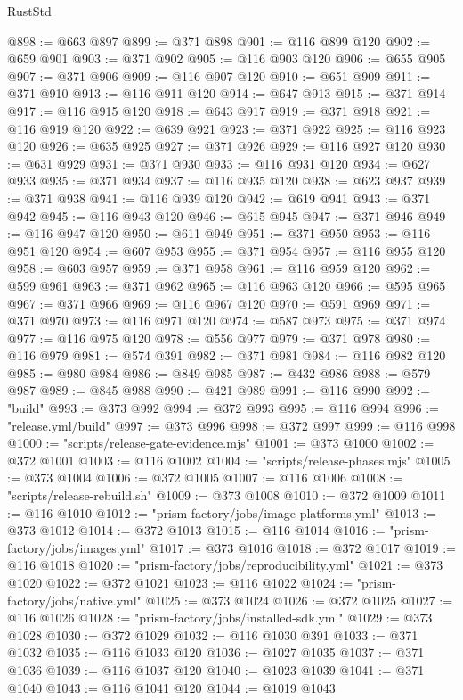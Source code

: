 \begin{lexlean}{RustStd}
\begin{coremodule}
@898 := @663 @897
@899 := @371 @898
@901 := @116 @899 @120
@902 := @659 @901
@903 := @371 @902
@905 := @116 @903 @120
@906 := @655 @905
@907 := @371 @906
@909 := @116 @907 @120
@910 := @651 @909
@911 := @371 @910
@913 := @116 @911 @120
@914 := @647 @913
@915 := @371 @914
@917 := @116 @915 @120
@918 := @643 @917
@919 := @371 @918
@921 := @116 @919 @120
@922 := @639 @921
@923 := @371 @922
@925 := @116 @923 @120
@926 := @635 @925
@927 := @371 @926
@929 := @116 @927 @120
@930 := @631 @929
@931 := @371 @930
@933 := @116 @931 @120
@934 := @627 @933
@935 := @371 @934
@937 := @116 @935 @120
@938 := @623 @937
@939 := @371 @938
@941 := @116 @939 @120
@942 := @619 @941
@943 := @371 @942
@945 := @116 @943 @120
@946 := @615 @945
@947 := @371 @946
@949 := @116 @947 @120
@950 := @611 @949
@951 := @371 @950
@953 := @116 @951 @120
@954 := @607 @953
@955 := @371 @954
@957 := @116 @955 @120
@958 := @603 @957
@959 := @371 @958
@961 := @116 @959 @120
@962 := @599 @961
@963 := @371 @962
@965 := @116 @963 @120
@966 := @595 @965
@967 := @371 @966
@969 := @116 @967 @120
@970 := @591 @969
@971 := @371 @970
@973 := @116 @971 @120
@974 := @587 @973
@975 := @371 @974
@977 := @116 @975 @120
@978 := @556 @977
@979 := @371 @978
@980 := @116 @979
@981 := @574 @391
@982 := @371 @981
@984 := @116 @982 @120
@985 := @980 @984
@986 := @849 @985
@987 := @432 @986
@988 := @579 @987
@989 := @845 @988
@990 := @421 @989
@991 := @116 @990
@992 := "build"
@993 := @373 @992
@994 := @372 @993
@995 := @116 @994
@996 := "release.yml/build"
@997 := @373 @996
@998 := @372 @997
@999 := @116 @998
@1000 := "scripts/release-gate-evidence.mjs"
@1001 := @373 @1000
@1002 := @372 @1001
@1003 := @116 @1002
@1004 := "scripts/release-phases.mjs"
@1005 := @373 @1004
@1006 := @372 @1005
@1007 := @116 @1006
@1008 := "scripts/release-rebuild.sh"
@1009 := @373 @1008
@1010 := @372 @1009
@1011 := @116 @1010
@1012 := "prism-factory/jobs/image-platforms.yml"
@1013 := @373 @1012
@1014 := @372 @1013
@1015 := @116 @1014
@1016 := "prism-factory/jobs/images.yml"
@1017 := @373 @1016
@1018 := @372 @1017
@1019 := @116 @1018
@1020 := "prism-factory/jobs/reproducibility.yml"
@1021 := @373 @1020
@1022 := @372 @1021
@1023 := @116 @1022
@1024 := "prism-factory/jobs/native.yml"
@1025 := @373 @1024
@1026 := @372 @1025
@1027 := @116 @1026
@1028 := "prism-factory/jobs/installed-sdk.yml"
@1029 := @373 @1028
@1030 := @372 @1029
@1032 := @116 @1030 @391
@1033 := @371 @1032
@1035 := @116 @1033 @120
@1036 := @1027 @1035
@1037 := @371 @1036
@1039 := @116 @1037 @120
@1040 := @1023 @1039
@1041 := @371 @1040
@1043 := @116 @1041 @120
@1044 := @1019 @1043

\end{coremodule}
\end{lexlean}
